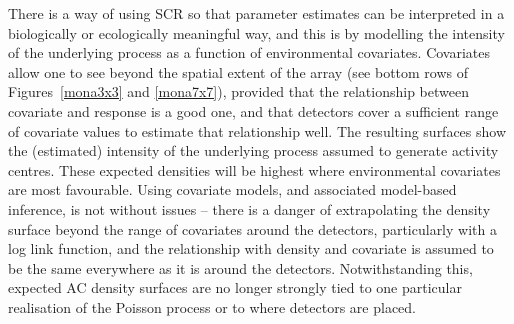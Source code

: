 \documentclass[useAMS,usenatbib,referee]{biom}
\begin{document}
There is a way of using SCR so that parameter estimates can be interpreted in a biologically or ecologically meaningful way, and this is by modelling the intensity of the underlying process as a function of environmental covariates. Covariates allow one to see beyond the spatial extent of the array (see bottom rows of Figures~\ref{mona3x3} and \ref{mona7x7}), provided that the relationship between covariate and response is a good one, and that detectors cover a sufficient range of covariate values to estimate that relationship well. The resulting surfaces show the (estimated) intensity of the underlying process assumed to generate activity centres. These expected densities will be highest where environmental covariates are most favourable. Using covariate models, and associated model-based inference, is not without issues -- there is a danger of extrapolating the density surface beyond the range of covariates around the detectors, particularly with a log link function, and the relationship with density and covariate is assumed to be the same everywhere as it is around the detectors. Notwithstanding this, expected AC density surfaces are no longer strongly tied to one particular realisation of the Poisson process or to where detectors are placed.


\end{document}
